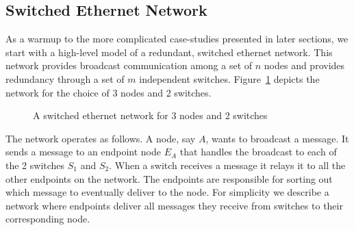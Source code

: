 \subsection{Switched Ethernet Network}
\label{ssec:swether}

As a warmup to the more complicated case-studies presented in later sections,
we start with a high-level model of a redundant, switched ethernet network.
This network provides broadcast communication among a set of $n$ nodes and
provides redundancy through a set of $m$ independent switches. Figure~\ref{fig:swether-diagram} depicts the network for the choice of 3 nodes and 2
switches.

\begin{figure}
\caption{A switched ethernet network for 3 nodes and 2 switches}
\label{fig:swether-diagram}
\end{figure}

The network operates as follows. A node, say $A$, wants to broadcast a
message. It sends a message to an endpoint node $E_A$ that handles the
broadcast to each of the 2 switches $S_1$ and $S_2$. When a switch receives a
message it relays it to all the other endpoints on the network. The endpoints
are responsible for sorting out which message to eventually deliver to the
node. For simplicity we describe a network where endpoints deliver all
messages they receive from switches to their corresponding node.

